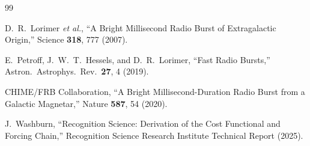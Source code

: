 \documentclass[12pt,a4paper]{article}
\theoremstyle{definition}
\theoremstyle{remark}
\begin{document}
\begin{thebibliography}{99}

D.~R.~Lorimer \textit{et al.}, ``A Bright Millisecond Radio Burst
of Extragalactic Origin,'' Science \textbf{318}, 777 (2007).

E.~Petroff, J.~W.~T.~Hessels, and D.~R.~Lorimer, ``Fast Radio
Bursts,'' Astron.\ Astrophys.\ Rev.\ \textbf{27}, 4 (2019).

CHIME/FRB Collaboration, ``A Bright Millisecond-Duration Radio
Burst from a Galactic Magnetar,'' Nature \textbf{587}, 54 (2020).

J.~Washburn, ``Recognition Science: Derivation of the Cost
Functional and Forcing Chain,'' Recognition Science Research
Institute Technical Report (2025).

\end{thebibliography}
\end{document}
